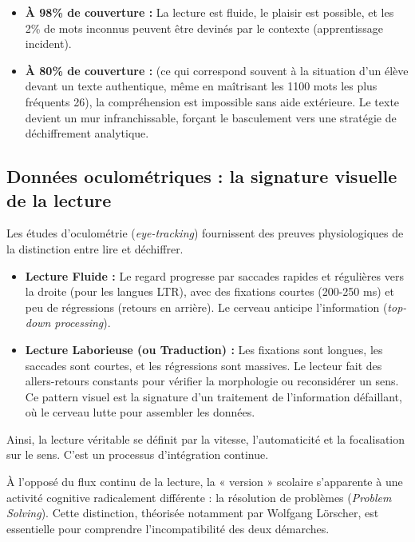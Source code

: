 \begin{itemize}\item \textbf{À 98\% de couverture :} La lecture est fluide, le plaisir est possible, et les 2\% de mots inconnus peuvent être devinés par le contexte (apprentissage incident).\item \textbf{À 80\% de couverture :} (ce qui correspond souvent à la situation d'un élève devant un texte authentique, même en maîtrisant les 1100 mots les plus fréquents 26), la compréhension est impossible sans aide extérieure. Le texte devient un mur infranchissable, forçant le basculement vers une stratégie de déchiffrement analytique.\end{itemize}

\subsection{Données oculométriques : la signature visuelle de la lecture}

Les études d'oculométrie (\textit{eye-tracking}) fournissent des preuves physiologiques de la
distinction entre lire et déchiffrer.

\begin{itemize}\item \textbf{Lecture Fluide :} Le regard progresse par saccades rapides et régulières vers la droite (pour les langues LTR), avec des fixations courtes (200-250 ms) et peu de régressions (retours en arrière).\cite{II-3-1-ref28} Le cerveau anticipe l'information (\textit{top-down processing}).\item \textbf{Lecture Laborieuse (ou Traduction) :} Les fixations sont longues, les saccades sont courtes, et les régressions sont massives.\cite{II-3-1-ref30} Le lecteur fait des allers-retours constants pour vérifier la morphologie ou reconsidérer un sens. Ce pattern visuel est la signature d'un traitement de l'information défaillant, où le cerveau lutte pour assembler les données.\end{itemize}Ainsi, la lecture véritable se définit par la vitesse, l'automaticité et la focalisation sur le
sens. C'est un processus d'intégration continue.

À l'opposé du flux continu de la lecture, la « version » scolaire s'apparente à une activité
cognitive radicalement différente : la résolution de problèmes (\textit{Problem Solving}). Cette
distinction, théorisée notamment par Wolfgang Lörscher, est essentielle pour comprendre
l'incompatibilité des deux démarches.




